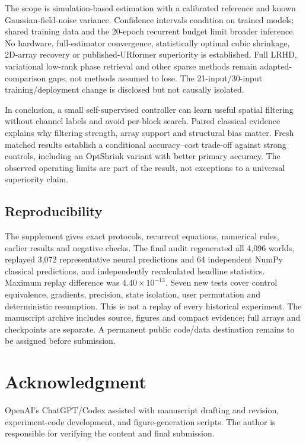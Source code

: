 \documentclass[10pt,journal,letterpaper]{IEEEtran}
\begin{document}
The scope is simulation-based estimation with a calibrated reference and known Gaussian-field-noise variance. Confidence intervals condition on trained models; shared training data and the 20-epoch recurrent budget limit broader inference. No hardware, full-estimator convergence, statistically optimal cubic shrinkage, 2D-array recovery or published-URformer superiority is established. Full LRHD, variational low-rank phase retrieval and other sparse methods remain adapted-comparison gaps, not methods assumed to lose. The 21-input/30-input training/deployment change is disclosed but not causally isolated.

In conclusion, a small self-supervised controller can learn useful spatial filtering without channel labels and avoid per-block search. Paired classical evidence explains why filtering strength, array support and structural bias matter. Fresh matched results establish a conditional accuracy--cost trade-off against strong controls, including an OptShrink variant with better primary accuracy. The observed operating limits are part of the result, not exceptions to a universal superiority claim.

\subsection{Reproducibility}
The supplement gives exact protocols, recurrent equations, numerical rules, earlier results and negative checks. The final audit regenerated all 4,096 worlds, replayed 3,072 representative neural predictions and 64 independent NumPy classical predictions, and independently recalculated headline statistics. Maximum replay difference was $4.40\times10^{-13}$. Seven new tests cover control equivalence, gradients, precision, state isolation, user permutation and deterministic resumption. This is not a replay of every historical experiment. The manuscript archive includes source, figures and compact evidence; full arrays and checkpoints are separate. A permanent public code/data destination remains to be assigned before submission.

\section*{Acknowledgment}
OpenAI's ChatGPT/Codex assisted with manuscript drafting and revision, experiment-code development, and figure-generation scripts. The author is responsible for verifying the content and final submission.


\end{document}
